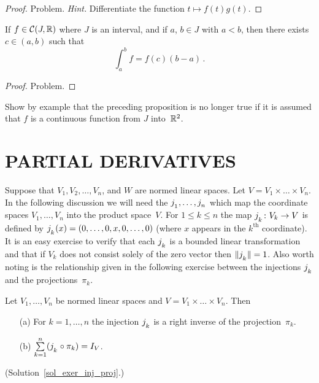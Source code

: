 \begin{proof} Problem.   \emph{Hint.}  Differentiate the function $t \mapsto f(t)g(t)$.   \ns
\end{proof}

\begin{prop}  If $f \in \mathcal{C}(J,\mathbb{R})$ where $J$ is an interval, and if $a$, $b \in J$ with
$a < b$, then there exists $c \in (a,b)$ such that
  \[ \int_a^b f = f(c)(b - a)\,. \]
\end{prop}

\begin{proof} Problem.  \ns  \end{proof}

\begin{prob} Show by example that the preceding proposition is no longer true if it is assumed
that $f$ is a continuous function from $J$ into~$\mathbb{R}^2$.
\end{prob}








\section{PARTIAL DERIVATIVES} Suppose that $V_1, V_2, \dots, V_n$, and $W$ are normed linear spaces.
Let $V = V_1\times \dots \times V_n$.  In the following discussion we will need the
 $j_{{}_{{\scriptstyle{1}}}}, \dots, j_{{}_{{\scriptstyle{n}}}}$ which map the
coordinate spaces $V_1, \dots, V_n $ into the product space~$V$.  For $1\le k \le n $ the map
$j_{{}_{{\scriptstyle{k}}}}\colon V_k \rightarrow V$ is defined by $j_{{}_{{\scriptstyle{k}}}}(x) = (0, \dots, 0, x, 0,
\dots, 0)$ (where $x$ appears in the $k^{\text {th}}$ coordinate). It is an easy exercise to
verify that each $j_{{}_{{\scriptstyle{k}}}}$ is a bounded linear transformation and that if $V_k$ does
not consist solely of the zero vector then $\lVert j_{{}_{{\scriptstyle{k}}}}\rVert = 1$.  Also worth noting is
the relationship given in the following exercise between the injections $j_{{}_{{\scriptstyle{k}}}}$ and
the projections~$\pi_k$.

\begin{exer}\label{exer_inj_proj}  Let $V_1, \dots, V_n$ be normed linear spaces and $V =
V_1 \times \dots \times V_n$.  Then
 \begin{enumerate}
  \item[(a)] For $k = 1, \dots, n$ the injection $j_{{}_{{\scriptstyle{k}}}}$ is a right inverse of the
projection~$\pi_k$.
  \item[(b)] $\sum\limits_{k=1}^n (j_{{}_{{\scriptstyle{k}}}} \circ \pi_k) = I_V$.
 \end{enumerate}
(Solution~\ref{sol_exer_inj_proj}.)
\end{exer}

